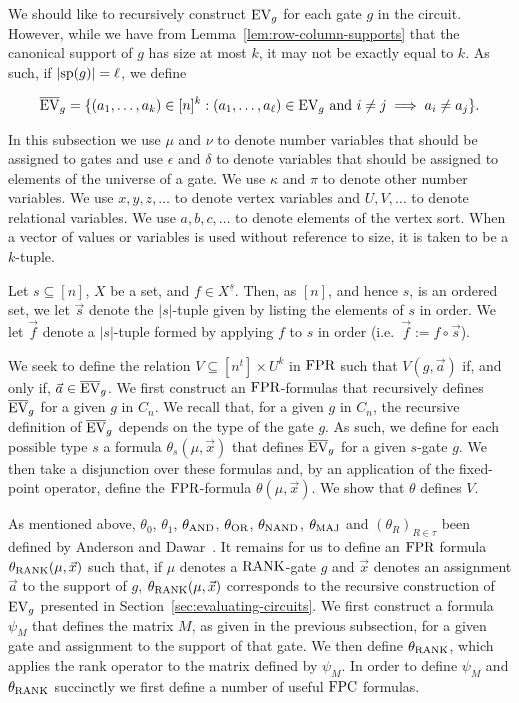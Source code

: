 \documentclass[../main/thesis.tex]{subfiles}
\begin{document}
We should like to recursively construct $\text{EV}_g$ for each gate $g$ in the
circuit. However, while we have from Lemma~\ref{lem:row-column-supports} that
the canonical support of $g$ has size at most $k$, it may not be exactly equal
to $k$. As such, if $\vert \text{sp}(g) \vert = \ell$, we define

\begin{align*}
	\overline{\text{EV}}_g = \{ (a_1, \ldots , a_k) \in [n]^k : (a_1 , \ldots , a_\ell ) \in \text{EV}_g \text{ and } i \neq j \implies a_i \neq a_j \}. 
\end{align*}

In this subsection we use $\mu$ and $\nu$ to denote number variables that should
be assigned to gates and use $\epsilon$ and $\delta$ to denote variables that
should be assigned to elements of the universe of a gate. We use $\kappa$ and
$\pi$ to denote other number variables. We use $x, y, z, \ldots$ to denote
vertex variables and $U, V, \ldots$ to denote relational variables. We use $a,
b, c , \ldots$ to denote elements of the vertex sort. When a vector of values or
variables is used without reference to size, it is taken to be a $k$-tuple.

Let $s \subseteq [n]$, $X$ be a set, and $f \in X^{\underline{s}}$. Then, as
$[n]$, and hence $s$, is an ordered set, we let $\vec{s}$ denote the $\vert s
\vert$-tuple given by listing the elements of $s$ in order. We let $\vec{f}$
denote a $\vert s \vert$-tuple formed by applying $f$ to $s$ in order (i.e.\
$\vec{f} := f \circ \vec{s}$).

We seek to define the relation $V \subseteq [n^t] \times U^k$ in $\text{\upshape FPR}$ such
that $V(g, \vec{a})$ if, and only if, $\vec{a} \in \overline {\text{EV}}_g$. We first
construct an $\text{\upshape FPR}$-formulas that recursively defines $\overline{\text{EV}}_g$ for a
given $g$ in $C_n$. We recall that, for a given $g$ in $C_n$, the recursive
definition of $\overline{\text{EV}}_g$ depends on the type of the gate $g$. As such,
we define for each possible type $s$ a formula $\theta_s(\mu, \vec{x})$ that
defines $\overline{\text{EV}}_g$ for a given $s$-gate $g$. We then take a disjunction
over these formulas and, by an application of the fixed-point operator, define
the $\text{\upshape FPR}$-formula $\theta(\mu, \vec{x})$. We show that $\theta$ defines $V$.


As mentioned above, $\theta_0$, $\theta_1$, $\theta_\text{\upshape AND}$, $\theta_\text{\upshape OR}$,
$\theta_\text{\upshape NAND}$, $\theta_\text{\upshape MAJ}$ and $(\theta_R)_{R \in \tau}$ been defined by
Anderson and Dawar~\cite{AndersonD17}. It remains for us to define an $\text{\upshape FPR}$
formula $\theta_{\text{\upshape RANK}}(\mu, \vec{x})$ such that, if $\mu$ denotes a
$\text{\upshape RANK}$-gate $g$ and $\vec{x}$ denotes an assignment $\vec{a}$ to the support of
$g$, $\theta_{\text{\upshape RANK}}(\mu, \vec{x})$ corresponds to the recursive construction of
$\text{EV}_g$ presented in Section~\ref{sec:evaluating-circuits}. We first construct a
formula $\psi_M$ that defines the matrix $M$, as given in the previous
subsection, for a given gate and assignment to the support of that gate. We then
define $\theta_{\text{\upshape RANK}}$, which applies the rank operator to the matrix defined
by $\psi_M$. In order to define $\psi_M$ and $\theta_\text{\upshape RANK}$ succinctly we first
define a number of useful $\text{\upshape FPC}$ formulas.
\end{document}
